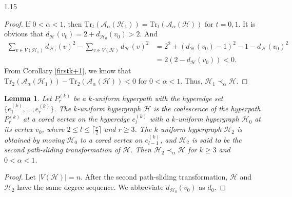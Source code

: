 \documentclass[preprint,12pt]{elsarticle1}
\newtheorem{lem}[thm]{Lemma}
\numberwithin{equation}{section}
\begin{document}
\begin{spacing}{1.15}
\begin{proof}
If $0<\alpha<1$, then $\mathrm{Tr}_{t}(\mathcal{A}_{\alpha}(\mathcal{H}_1))=\mathrm{Tr}_{t}(\mathcal{A}_{\alpha}(\mathcal{H}))$ for $t=0,1$.
It is obvious that $d_{\mathcal{H}}(v_0)=2+d_{\mathcal{H}_0}(v_0)>2$.
And
\begin{align*}
\sum_{v\in V(\mathcal{H}_1)}d_{\mathcal{H}_1}(v)^2-\sum_{v\in V(\mathcal{H})}d_{\mathcal{H}}(v)^2
&=2^2+(d_{\mathcal{H}}(v_0)-1)^2-1-d_{\mathcal{H}}(v_0)^2\\
&=2\left( 2-d_{\mathcal{H}}(v_0) \right)<0.
\end{align*}
From Corollary \ref{firstk+1}, we know that $\mathrm{Tr}_{2}(\mathcal{A}_{\alpha}(\mathcal{H}_1))-\mathrm{Tr}_{2}(\mathcal{A}_{\alpha}(\mathcal{H}))<0$ for $0<\alpha<1$.
Thus, $\mathcal{H}_1\prec_{\alpha}\mathcal{H}$.
\end{proof}

\begin{lem}\label{4}
Let $P_{r}^{(k)}$ be a $k$-uniform hyperpath with the hyperedge set $\{e_1^{(k)},\ldots,e_{r}^{(k)}\}$.
The $k$-uniform hypergraph $\mathcal{H}$ is the coalescence of the hyperpath $P_{r}^{(k)}$ at a cored vertex on the hyperedge $e_{l}^{(k)}$ with a $k$-uniform hypergraph $\mathcal{H}_0$ at its vertex $v_0$, where $2\le l\le \lceil\frac{r}{2}\rceil$ and $r\ge3$.
The $k$-uniform hypergraph $\mathcal{H}_{2}$ is obtained by moving $\mathcal{H}_0$ to a cored vertex on $e_{l-1}^{(k)}$, and $\mathcal{H}_2$ is said to be \textit{the second path-sliding transformation} of $\mathcal{H}$.
Then $\mathcal{H}_2\prec_{\alpha}\mathcal{H}$ for $k\ge3$ and $0<\alpha<1$.
\end{lem}

\begin{proof}
Let $|V(\mathcal{H})|=n$.
After the second path-sliding transformation, $\mathcal{H}$ and $\mathcal{H}_{2}$ have the same degree sequence.
We abbreviate $d_{\mathcal{H}_0}(v_0)$ as $d_0$.


\end{proof}
\end{spacing}
\end{document}
